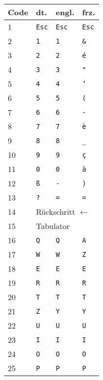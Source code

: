 \begin{longtable}{|l|l|l|l|}
  \hline
  \textbf{Code} & \textbf{dt.} & \textbf{engl.} & \textbf{frz.} \\
  \endhead
  \hline
  1 & \texttt{Esc} & \texttt{Esc} & \texttt{Esc} \\ \hline
  2 & \texttt{1}   & \texttt{1}   & \texttt{\&} \\ \hline
  3 & \texttt{2}   & \texttt{2}   & \texttt{é} \\ \hline
  4 & \texttt{3}   & \texttt{3}   & \texttt{"} \\ \hline
  5 & \texttt{4}   & \texttt{4}   & \texttt{'} \\ \hline
  6 & \texttt{5}   & \texttt{5}   & \texttt{(} \\ \hline
  7 & \texttt{6}   & \texttt{6}   & \texttt{-} \\ \hline
  8 & \texttt{7}   & \texttt{7}   & \texttt{è} \\ \hline
  9 & \texttt{8}   & \texttt{8}   & \texttt{\_} \\ \hline
  10 & \texttt{9}   & \texttt{9}   & \texttt{ç} \\ \hline
  11 & \texttt{0}   & \texttt{0}   & \texttt{à} \\ \hline
  12 & \texttt{ß}   & \texttt{-}   & \texttt{)} \\ \hline
  13 & \texttt{?}   & \texttt{=}   & \texttt{=} \\ \hline
  14 & \multicolumn{3}{|l|}{Rückschritt $\longleftarrow$} \\ \hline
  15 & \multicolumn{3}{|l|}{Tabulator} \\ \hline
  16 & \texttt{Q} & \texttt{Q} & \texttt{A} \\ \hline
  17 & \texttt{W} & \texttt{W} & \texttt{Z} \\ \hline
  18 & \texttt{E} & \texttt{E} & \texttt{E} \\ \hline
  19 & \texttt{R} & \texttt{R} & \texttt{R} \\ \hline
  20 & \texttt{T} & \texttt{T} & \texttt{T} \\ \hline
  21 & \texttt{Z} & \texttt{Y} & \texttt{Y} \\ \hline
  22 & \texttt{U} & \texttt{U} & \texttt{U} \\ \hline
  23 & \texttt{I} & \texttt{I} & \texttt{I} \\ \hline
  24 & \texttt{O} & \texttt{O} & \texttt{O} \\ \hline
  25 & \texttt{P} & \texttt{P} & \texttt{P} \\ \hline

\end{longtable}
